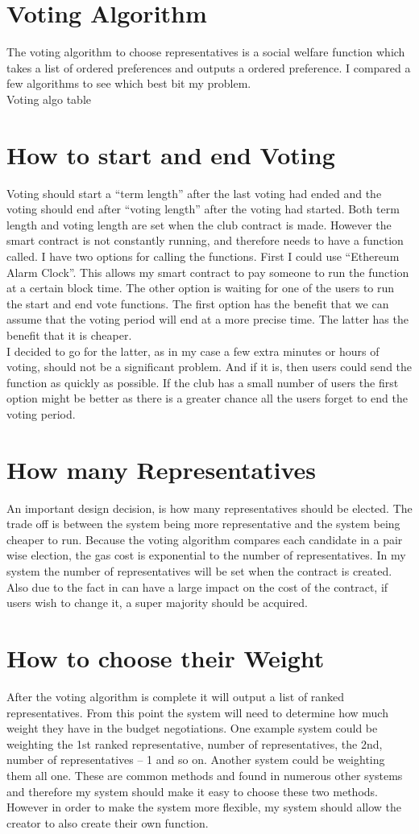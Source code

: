 \section{Voting Algorithm}
The voting algorithm to choose representatives is a social welfare function which takes a list of ordered preferences and outputs a ordered preference. I compared a few algorithms to see which best bit my problem.
\\
Voting algo table
\section{How to start and end Voting}
Voting should start a “term length” after the last voting had ended and the voting should end after “voting length” after the voting had started. Both term length and voting length are set when the club contract is made. However the smart contract is not constantly running, and therefore needs to have a function called. I have two options for calling the functions. First I could use “Ethereum Alarm Clock”. This allows my smart contract to pay someone to run the function at a certain block time. The other option is waiting for one of the users to run the start and end vote functions. The first option has the benefit that we can assume that the voting period will end at a more precise time. The latter has the benefit that it is cheaper.
\\
I decided to go for the latter, as in my case a few extra minutes or hours of voting, should not be a significant problem. And if it is, then users could send the function as quickly as possible. If the club has a small number of users the first option might be better as there is a greater chance all the users forget to end the voting period.
\section{How many Representatives}
An important design decision, is how many representatives should be elected. The trade off is between the system being more representative and the system being cheaper to run. Because the voting algorithm compares each candidate in a pair wise election, the gas cost is exponential to the number of representatives. In my system the number of representatives will be set when the contract is created. Also due to the fact in can have a large impact on the cost of the contract, if users wish to change it, a super majority should be acquired.
\section{How to choose their Weight}
After the voting algorithm is complete it will output a list of ranked representatives. From this point the system will need to determine how much weight they have in the budget negotiations. One example system  could be weighting the 1st ranked representative, number of representatives, the 2nd, number of representatives – 1 and so on. Another system could be weighting them all one. These are common methods and found in numerous other systems and therefore my system should make it easy to choose these two methods. However in order to make the system more flexible, my system should allow the creator to also create their own function.
